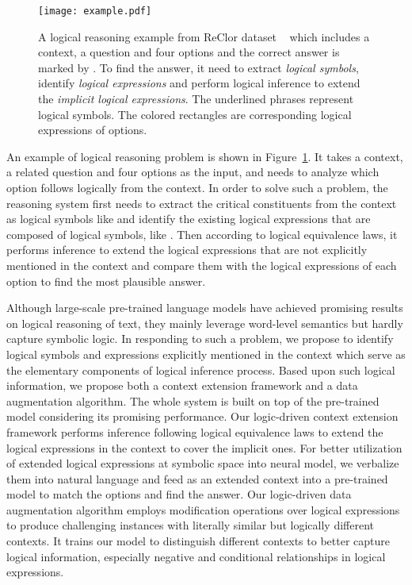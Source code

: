 \documentclass[11pt,a4paper]{article}
\begin{document}
\begin{figure}[!th]
\centering
\texttt{[image: example.pdf]}
\caption{\label{figure1} A logical reasoning example from ReClor dataset ~\cite{yu2020reclor} which includes a context, a question and four options and the correct answer is marked by \textcolor[RGB]{74,163,87}{\checkmark}. To find the answer, it need to extract \emph{logical symbols}, identify \emph{logical expressions} and perform logical inference to extend the \emph{implicit logical expressions}. The underlined phrases represent logical symbols. The colored rectangles are corresponding logical expressions of options.}
\end{figure}
An example of logical reasoning problem is shown in Figure~\ref{figure1}. It takes a context, a related question and four options as the input, and needs to analyze which option follows logically from the context.
In order to solve such a problem, the reasoning system first needs to extract the critical constituents from the context as logical symbols like  and identify the existing logical expressions that are composed of logical symbols, like .
Then according to logical equivalence laws, it performs inference to extend the logical expressions that are not explicitly mentioned in the context and compare them with the logical expressions of each option to find
the most plausible answer.








Although large-scale pre-trained language models \cite{devlin2019bert, liu2019roberta, yang2019xlnet} have achieved promising results on logical reasoning of text, they mainly leverage word-level semantics but hardly capture symbolic logic.
In responding to such a problem, we propose to identify logical symbols and expressions explicitly mentioned in the context which serve as the elementary components of logical inference process.
Based upon such logical information, we propose both a context extension framework and a data augmentation algorithm. 
The whole system is built on top of the pre-trained model considering its promising performance.
Our logic-driven context extension framework performs inference following logical equivalence laws to extend the logical expressions in the context to cover the implicit ones.
For better utilization of extended logical expressions at symbolic space into neural model, we verbalize them into natural language and feed as an extended context into a pre-trained model to match the options and find the answer.
Our logic-driven data augmentation algorithm employs modification operations over logical expressions to produce challenging instances with literally similar but logically different contexts. It trains our model to distinguish different contexts to better capture logical information, especially negative and conditional relationships in logical expressions.
\end{document}
